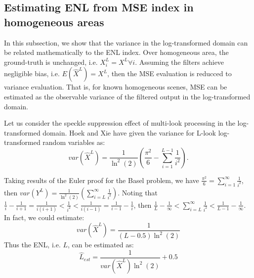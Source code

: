 \documentclass[journal]{IEEEtran}
\begin{document}
\subsection{ Estimating ENL from MSE index in homogeneous areas }
\label{sec:homogeneous_theoretical}

In this subsection, we show that the variance in the log-transformed domain can be related mathematically to the ENL 
index. Over homogeneous area, the ground-truth is unchanged, i.e. $X^L_i=X^L \forall i$.
Assuming the filters achieve negligible bias, i.e. $E(\hat{X}^L)=X^L$, 
	then the MSE evaluation is reducced to variance evaluation.
That is, for known homogeneous scenes, MSE can be estimated as the observable variance of the filtered 
output in the log-transformed domain.

Let us consider the speckle suppression effect of multi-look processing in the log-transformed domain. 
Hoek \cite{Hoekman_1991_TGRS} and Xie \cite{Xie_2002_TGRS} have given the variance for L-look log-transformed random 
variables as: 
\begin{equation}
var(\hat{X}^L)= \frac{1}{\ln^2(2)} \left( \frac{\pi^2}{6} - \sum^{L-1}_{i=1}{\frac{1}{i^2}} \right).
\label{eqn:perf_index_theoretical}
\end{equation}

Taking results of the Euler proof for the Basel problem, we have $\frac{\pi^2}{6} = \sum^{\infty}_{i=1}{ \frac{1}{i^2} } $, then $var(Y^L)= \frac{1}{\ln^2(2)} \left( \sum^{\infty}_{i=L}{ \frac{1}{i^2} } \right) $.
Noting that $ \frac{1}{i} - \frac{1}{i+1} = \frac{1}{i(i+1)} < \frac{1}{i^2} < \frac{1}{i(i-1)} = \frac{1}{i-1} - \frac{1}{i}$, then $ \frac{1}{L} - \frac{1}{\infty} < \sum^{\infty}_{i=L}{ \frac{1}{i^2} }  < \frac{1}{L-1} - \frac{1}{\infty} $.
In fact, we could estimate:
\begin{equation}
  var(\hat{X}^L) = \frac{1}{(L-0.5) \ln^2(2) }
\label{eqn:perf_index_analytic}
\end{equation}
Thus the ENL, i.e. $L$, can be estimated as:
\begin{equation}
\hat{L}_{est} = \frac{1}{var(\hat{X}^L) \ln^2(2)} + 0.5
\label{eqn:enl_analytic}
\end{equation}
\end{document}
